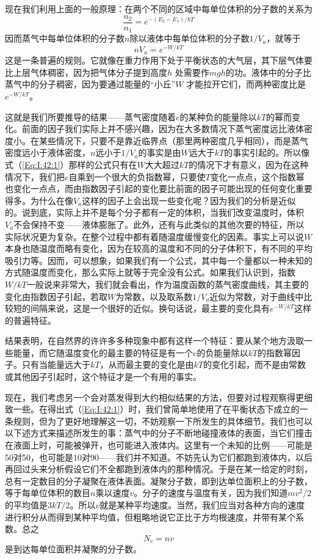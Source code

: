 现在我们利用上面的一般原理：在两个不同的区域中每单位体积的分子数的关系为
\begin{equation*}
    \frac{n_2}{n_1} = e^{-(E_2 - E_1)/kT}
\end{equation*}
因而蒸气中每单位体积的分子数$n$除以液体中每单位体积的分子数$1/V_a$，就等于
\begin{equation}
    \label{Eq:I:42:1}
    nV_a=e^{-W/kT}
\end{equation}
这是一条普遍的规则。它就像在重力作用下处于平衡状态的大气层，其下层气体要比上层气体稠密，因为把气体分子提到高度$h$ 处需要作$mgh$的功。液体中的分子比蒸气中的分子稠密，因为要通过能量的“小丘”$W$ 才能拉开它们，而两种密度比是$e^{-W/kT}$。

这就是我们所要推导的结果——蒸气密度随着$e$的某种负的能量除以$kT$的幂而变化。前面的因子我们实际上并不感兴趣，因为在大多数情况下蒸气密度远比液体密度小。在某些情况下，只要不是靠近临界点（那里两种密度几乎相同），而是蒸气密度远小于液体密度，$n$远小于$1/V_a$的事实是由$W$远大于$kT$的事实引起的。所以像式（\ref{Eq:I:42:1}）那样的公式只有在$W$大大超过$kT$的情况下才有意义，因为在这种情况下，我们把$e$自乘到一个很大的负指数幂，只要使$T$变化一点点，这个指数幂也变化一点点，而由指数因子引起的变化要比前面的因子可能出现的任何变化重要得多。为什么在像$V_a$这样的因子上会出现一些变化呢？因为我们的分析是近似的。说到底，实际上并不是每个分子都有一定的体积，当我们改变温度时，体积$V_a$不会保持不变——液体膨胀了。此外，还有与此类似的其他次要的特征，所以实际状况更为复杂。在整个过程中都有着随温度缓慢变化的因素。事实上可以说$W$本身也随温度而略有变化，因为在较高的温度和不同的分子体积下，有不同的平均吸引力等。因而，可以想象，如果我们有一个公式，其中每一个量都以一种未知的方式随温度而变化，那么实际上就等于完全没有公式。如果我们认识到，指数$W/kT$一般说来非常大，我们就会看出，作为温度函数的蒸气密度曲线，其主要的变化由指数因子引起，若取$W$为常数，以及取系数$1/V_a$近似为常数，对于曲线中比较短的间隔来说，这是一个很好的近似。换句话说，最主要的变化具有$e^{-W/kT}$这样的普遍特征。

结果表明，在自然界的许许多多种现象中都有这样一个特征：要从某个地方汲取一些能量，而它随温度变化的最主要的特征是有一个$e$的负能量除以$kT$的指数幂因子。只有当能量远大于$kT$，从而最主要的变化是由$kT$的变化引起，而不是由常数或其他因子引起时，这个特征才是一个有用的事实。

现在，我们考虑另一个会对蒸发得到大约相似结果的方法，但要对过程观察得更细致一些。在得出式（\ref{Eq:I:42:1}）时，我们曾简单地使用了在平衡状态下成立的一条规则，但为了更好地理解这一切，不妨观察一下所发生的具体细节。我们也可以以下述方式来描述所发生的事：蒸气中的分子不断地碰撞液体的表面，当它们撞击在液面上时，可能被弹开，也可能进入液体内。这里有一个未知的比例——可能是50对50，也可能是10对90——我们并不知道。不妨先认为它们都跑到液体内，以后再回过头来分析假设它们不全都跑到液体内的那种情况。于是在某一给定的时刻，总有一定数目的分子凝聚在液体表面。凝聚分子数，即到达单位面积上的分子数，等于每单位体积的数目$n$乘以速度$v$。分子的速度与温度有关，因为我们知道$mv^2/2$的平均值是$3kT/2$。所以$v$就是某种平均速度。当然，我们应当对各种方向的速度进行积分从而得到某种平均值，但粗略地说它正比于方均根速度，并带有某个系数。总之
\begin{equation}
    \label{Eq:I:42:2}
    N_c=nv
\end{equation}
是到达每单位面积并凝聚的分子数。

